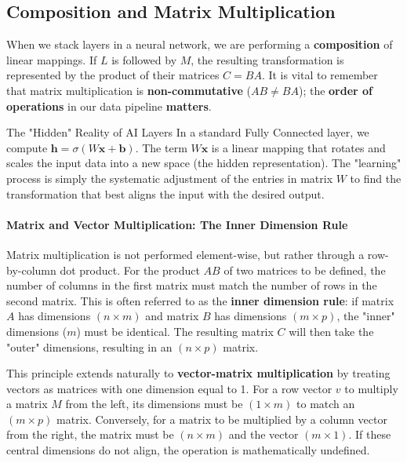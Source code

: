 \documentclass[12pt,a4paper,twoside,openright]{book}
\begin{document}
\subsection{Composition and Matrix Multiplication}
When we stack layers in a neural network, we are performing a \textbf{composition} of linear mappings. If $L$ is followed by $M$, the resulting transformation is represented by the product of their matrices $C = BA$. It is vital to remember that matrix multiplication is \textbf{non-commutative} ($AB \neq BA$); the \textbf{order of operations} in our data pipeline \textbf{matters}.

\begin{unibobox}{The "Hidden" Reality of AI Layers}
    In a standard Fully Connected layer, we compute $\mathbf{h} = \sigma(W\mathbf{x} + \mathbf{b})$. The term $W\mathbf{x}$ is a linear mapping that rotates and scales the input data into a new space (the hidden representation). The "learning" process is simply the systematic adjustment of the entries in matrix $W$ to find the transformation that best aligns the input with the desired output.
\end{unibobox}

\paragraph{Matrix and Vector Multiplication: The Inner Dimension Rule}

Matrix multiplication is not performed element-wise, but rather through a row-by-column dot product. For the product $AB$ of two matrices to be defined, the number of columns in the first matrix must match the number of rows in the second matrix. This is often referred to as the \textbf{inner dimension rule}: if matrix $A$ has dimensions $(n \times m)$ and matrix $B$ has dimensions $(m \times p)$, the "inner" dimensions ($m$) must be identical. The resulting matrix $C$ will then take the "outer" dimensions, resulting in an $(n \times p)$ matrix.



This principle extends naturally to \textbf{vector-matrix multiplication} by treating vectors as matrices with one dimension equal to 1. For a row vector $v$ to multiply a matrix $M$ from the left, its dimensions must be $(1 \times m)$ to match an $(m \times p)$ matrix. Conversely, for a matrix to be multiplied by a column vector from the right, the matrix must be $(n \times m)$ and the vector $(m \times 1)$. If these central dimensions do not align, the operation is mathematically undefined.
\end{document}
